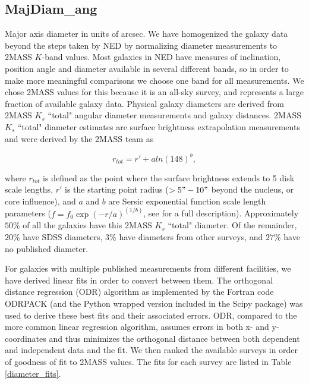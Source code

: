\subsection{MajDiam\_ang} \label{diameters}
Major axis diameter in units of arcsec. We have homogenized the galaxy data beyond the steps taken by NED by normalizing diameter measurements to 2MASS $K$-band values. Most galaxies in NED have measures of inclination, position angle and diameter available in several different bands, so in order to make more meaningful comparisons we choose one band for all measurements. We chose 2MASS values for this because it is an all-sky survey, and represents a large fraction of available galaxy data. Physical galaxy diameters are derived from 2MASS $K_s$ ``total" angular diameter measurements and galaxy distances. 2MASS $K_s$ ``total" diameter estimates are surface brightness extrapolation measurements and were derived by the 2MASS team as 

\begin{equation}
r_{tot} = r' + a ln(148)^b,
\end{equation}

\noindent where $r_{tot}$ is defined as the point where the surface brightness extends to 5 disk scale lengths, $r'$ is the starting point radius ($>5" - 10"$ beyond the nucleus, or core influence), and $a$ and $b$ are Sersic exponential function scale length parameters ($f = f_0 \exp{(-r/a)}^{(1/b)}$, see \citealt{jarrett2003} for a full description). Approximately $50\%$ of all the galaxies have this 2MASS $K_s$ ``total" diameter. Of the remainder, $20\%$ have SDSS diameters, $3\%$ have diameters from other surveys, and $27\%$ have no published diameter. 

For galaxies with multiple published measurements from different facilities, we have derived linear fits in order to convert between them. The orthogonal distance regression (ODR) algorithm as implemented by the Fortran code ODRPACK (and the Python wrapped version included in the Scipy package) was used to derive these best fits and their associated errors. ODR, compared to the more common linear regression algorithm, assumes errors in both x- and y-coordinates and thus minimizes the orthogonal distance between both dependent and independent data and the fit. We then ranked the available surveys in order of goodness of fit to 2MASS values. The fits for each survey are listed in Table \ref{diameter_fits}. 

